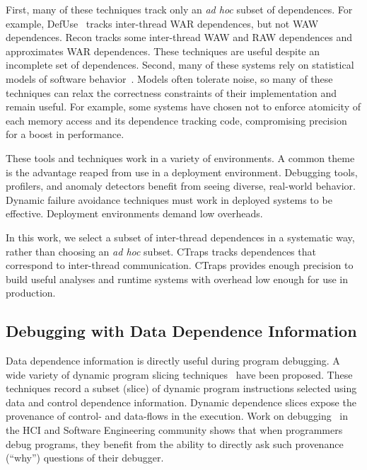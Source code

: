 \documentclass[preprint,9pt]{sigplanconf}
\newcommand{\ctraps}{CTraps\xspace}
\begin{document}
First, many of these techniques track only an {\em ad hoc} subset of
dependences.  For example, DefUse~\cite{defuse} tracks inter-thread WAR
dependences, but not WAW dependences.  Recon tracks some inter-thread WAW and
RAW dependences and approximates WAR dependences.  These techniques are useful
despite an incomplete set of dependences.  Second, many of these systems rely
on statistical models of software
behavior~\cite{avio,cci,defuse,recon,bugaboo,falcon,dmtracker,aviso,threadcriticality,schedpredictionmodel}.
Models often tolerate noise, so many of these techniques can relax the
correctness constraints of their implementation and remain useful.  For
example, some systems have chosen not to enforce atomicity of each memory
access and its dependence tracking code, compromising precision for a boost in
performance.

These tools and techniques work in a variety of environments.  A common theme
is the advantage reaped from use in a deployment environment.  Debugging tools,
profilers, and anomaly detectors benefit from seeing diverse, real-world
behavior.  Dynamic failure avoidance techniques must work in deployed systems
to be effective.  Deployment environments demand low overheads.  

In this work, we select a subset of inter-thread dependences in a systematic
way, rather than choosing an {\em ad hoc} subset.  \ctraps tracks dependences
that correspond to inter-thread communication.  \ctraps provides enough
precision to build useful analyses and runtime systems with overhead low enough
for use in production.


\subsection{Debugging with Data Dependence Information}

Data dependence information is directly useful during program debugging.  A
wide variety of dynamic program slicing
techniques~\cite{thinslicing,tipslicingsurvey} have been proposed.  These
techniques record a subset (slice) of dynamic program instructions selected
using data and control dependence information.  Dynamic dependence slices
expose the provenance of control- and data-flows in the execution.  Work on
debugging~\cite{whylinechi,whylineicse} in the HCI and Software Engineering
community shows that when programmers debug programs, they benefit from the
ability to directly ask such provenance (``why'') questions of their debugger.  
\end{document}
